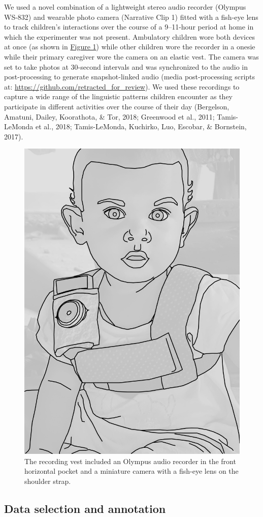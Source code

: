 \documentclass[floatsintext,man]{apa6}
\theoremstyle{definition}
\theoremstyle{definition}
\theoremstyle{definition}
\theoremstyle{remark}
\begin{document}
We used a novel combination of a lightweight stereo audio recorder
(Olympus WS-832) and wearable photo camera (Narrative Clip 1) fitted
with a fish-eye lens to track children's interactions over the course of
a 9--11-hour period at home in which the experimenter was not present.
Ambulatory children wore both devices at once (as shown in
\protect\hyperlink{fig1}{Figure 1}) while other children wore the
recorder in a onesie while their primary caregiver wore the camera on an
elastic vest. The camera was set to take photos at 30-second intervals
and was synchronized to the audio in post-processing to generate
snapshot-linked audio (media post-processing scripts at:
\url{https://github.com/retracted_for_review}). We used these recordings
to capture a wide range of the linguistic patterns children encounter as
they participate in different activities over the course of their day
(Bergelson, Amatuni, Dailey, Koorathota, \& Tor, 2018; Greenwood et al.,
2011; Tamis-LeMonda et al., 2018; Tamis-LeMonda, Kuchirko, Luo, Escobar,
\& Bornstein, 2017).

\begin{figure}

{\centering \includegraphics[width=0.3\linewidth]{Tseltal-CLE_files/TseltalCLE-RecordingVest} 

}

\caption{The recording vest included an Olympus audio recorder in the front horizontal pocket and a miniature camera with a fish-eye lens on the shoulder strap.}\label{fig:fig1}
\end{figure}

\subsection{Data selection and annotation}\label{methods-samples}
\end{document}
